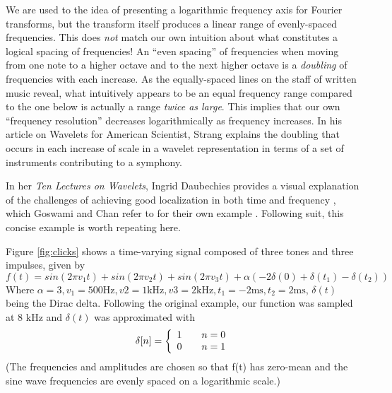 \documentclass[letterpaper]{article}
\begin{document}
We are used to the idea of presenting a logarithmic frequency axis for Fourier transforms,
but the transform itself produces a linear range of evenly-spaced frequencies.
This does \emph{not} match our own intuition about what constitutes a logical spacing of frequencies!
An ``even spacing'' of frequencies when moving from one note to a higher octave and to the next higher octave is
a \emph{doubling} of frequencies with each increase.
As the equally-spaced lines on the staff of written music reveal,
what intuitively appears to be an equal frequency range compared to the one below is actually a range \emph{twice as large}.
This implies that our own ``frequency resolution'' decreases logarithmically as frequency increases.
In his article on Wavelets for American Scientist, Strang explains the doubling that occurs in each increase of scale
in a wavelet representation in terms of a set of instruments contributing to a symphony.

In her \emph{Ten Lectures on Wavelets}, Ingrid Daubechies provides a visual explanation of the challenges of achieving
good localization in both time and frequency \cite[Fig.~1.3]{daub}, which Goswami and Chan refer to for their own example \cite[Fig.~4.5]{goswami}.
Following suit, this concise example is worth repeating here. 

Figure \ref{fig:clicks} shows a time-varying signal composed of three tones and three impulses, given by
\[
f(t) = sin(2 \pi v_1 t) + sin(2 \pi v_2 t) + sin(2 \pi v_3 t) + \alpha(-2 \delta(0) + \delta(t_1) -\delta(t_2))
\]
Where \( \alpha = 3, v_1 = 500 \mathrm{Hz}, v2 = 1 \mathrm{kHz}, v3 = 2 \mathrm{kHz}, t_1 = -2 \mathrm{ms}, t_2 = 2 \mathrm{ms} \),
\(\delta(t)\) being the Dirac delta.  Following the original example, our function was sampled at 8 kHz
and \( \delta(t) \) was approximated with 
\[
\delta[n] = \left\{ 
  \begin{array}{l l}
    1 & \quad n=0 \\
    0 & \quad n=1
  \end{array} \right.
\]
(The frequencies and amplitudes are chosen so that f(t) has zero-mean and the sine wave frequencies are evenly spaced on a logarithmic scale.)
\end{document}
